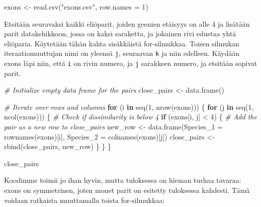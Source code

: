 \documentclass[
]{book}
\newenvironment{Shaded}{\begin{snugshade}}{\end{snugshade}}
\newcommand{\AttributeTok}[1]{\textcolor[rgb]{0.77,0.63,0.00}{#1}}
\newcommand{\CommentTok}[1]{\textcolor[rgb]{0.56,0.35,0.01}{\textit{#1}}}
\newcommand{\ControlFlowTok}[1]{\textcolor[rgb]{0.13,0.29,0.53}{\textbf{#1}}}
\newcommand{\DecValTok}[1]{\textcolor[rgb]{0.00,0.00,0.81}{#1}}
\newcommand{\FunctionTok}[1]{\textcolor[rgb]{0.00,0.00,0.00}{#1}}
\newcommand{\NormalTok}[1]{#1}
\newcommand{\OtherTok}[1]{\textcolor[rgb]{0.56,0.35,0.01}{#1}}
\newcommand{\SpecialCharTok}[1]{\textcolor[rgb]{0.00,0.00,0.00}{#1}}
\newcommand{\StringTok}[1]{\textcolor[rgb]{0.31,0.60,0.02}{#1}}
\begin{document}
\begin{Shaded}
\begin{Highlighting}[]
\NormalTok{exons }\OtherTok{\textless{}{-}} \FunctionTok{read.csv}\NormalTok{(}\StringTok{"exons.csv"}\NormalTok{, }\AttributeTok{row.names =} \DecValTok{1}\NormalTok{)}
\end{Highlighting}
\end{Shaded}

Etsitään seuravaksi kaikki eliöparit, joiden geenien etäisyys on alle 4 ja lisätään parit datakehikkoon, jossa on kaksi saraketta, ja jokainen rivi edustaa yhtä eliöparia. Käytetään tähän kahta sisäkkäistä for-silmukkaa. Toisen silmukan iteraatiomuuttujan nimi on yleensä \texttt{j}, seuraavan \texttt{k} ja niin edelleen. Käydään exons läpi niin, että \texttt{i} on rivin numero, ja \texttt{j} sarakkeen numero, ja etsitään sopivat parit.

\begin{Shaded}
\begin{Highlighting}[]
\CommentTok{\# Initialize empty data frame for the pairs}
\NormalTok{close\_pairs }\OtherTok{\textless{}{-}} \FunctionTok{data.frame}\NormalTok{()}

\CommentTok{\# Iterate over rows and columns}
\ControlFlowTok{for}\NormalTok{ (i }\ControlFlowTok{in} \FunctionTok{seq}\NormalTok{(}\DecValTok{1}\NormalTok{, }\FunctionTok{nrow}\NormalTok{(exons))) \{}
  \ControlFlowTok{for}\NormalTok{ (j }\ControlFlowTok{in} \FunctionTok{seq}\NormalTok{(}\DecValTok{1}\NormalTok{, }\FunctionTok{ncol}\NormalTok{(exons))) \{}
    \CommentTok{\# Check if dissimilarity is below 4}
    \ControlFlowTok{if}\NormalTok{ (exons[i, j] }\SpecialCharTok{\textless{}} \DecValTok{4}\NormalTok{) \{}
      \CommentTok{\# Add the pair as a new row to close\_pairs}
\NormalTok{      new\_row }\OtherTok{\textless{}{-}} \FunctionTok{data.frame}\NormalTok{(}\AttributeTok{Species\_1 =} \FunctionTok{rownames}\NormalTok{(exons)[i],}
                            \AttributeTok{Species\_2 =} \FunctionTok{colnames}\NormalTok{(exons)[j])}
\NormalTok{      close\_pairs }\OtherTok{\textless{}{-}} \FunctionTok{rbind}\NormalTok{(close\_pairs,}
\NormalTok{                           new\_row)}
\NormalTok{    \}}
\NormalTok{  \}}
\NormalTok{\}}

\NormalTok{close\_pairs}
\end{Highlighting}
\end{Shaded}

Koodimme toimii jo ihan hyvin, mutta tuloksessa on hieman turhaa tavaraa: exons on symmetrinen, joten monet parit on esitetty tuloksessa kahdesti. Tämä voidaan ratkaista muuttamalla toista for-silmukkaa:
\end{document}
